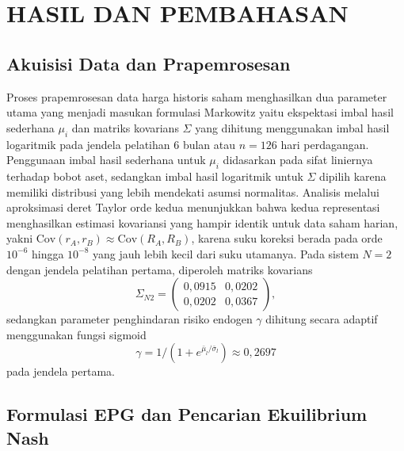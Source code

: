 \section{HASIL DAN PEMBAHASAN}

\subsection{Akuisisi Data dan Prapemrosesan}

Proses prapemrosesan data harga historis saham menghasilkan dua parameter utama yang menjadi masukan formulasi Markowitz yaitu ekspektasi imbal hasil sederhana $\mu_i$ dan matriks kovarians $\Sigma$ yang dihitung menggunakan imbal hasil logaritmik pada jendela pelatihan 6 bulan atau $n=126$ hari perdagangan. Penggunaan imbal hasil sederhana untuk $\mu_i$ didasarkan pada sifat liniernya terhadap bobot aset, sedangkan imbal hasil logaritmik untuk $\Sigma$ dipilih karena memiliki distribusi yang lebih mendekati asumsi normalitas. Analisis melalui aproksimasi deret Taylor orde kedua menunjukkan bahwa kedua representasi menghasilkan estimasi kovariansi yang hampir identik untuk data saham harian, yakni $\text{Cov}(r_A, r_B) \approx \text{Cov}(R_A, R_B)$, karena suku koreksi berada pada orde $10^{-6}$ hingga $10^{-8}$ yang jauh lebih kecil dari suku utamanya. Pada sistem $N=2$ dengan jendela pelatihan pertama, diperoleh matriks kovarians 
\begin{equation*}
\Sigma_{N2} = \begin{pmatrix} 0{,}0915 & 0{,}0202 \\ 0{,}0202 & 0{,}0367 \end{pmatrix},
\end{equation*}
sedangkan parameter penghindaran risiko endogen $\gamma$ dihitung secara adaptif menggunakan fungsi sigmoid 
\begin{equation*}
\gamma = 1/(1+e^{\bar{\mu}_l/\bar{\sigma}_l}) \approx 0{,}2697
\end{equation*}
pada jendela pertama.

\subsection{Formulasi EPG dan Pencarian Ekuilibrium Nash}

